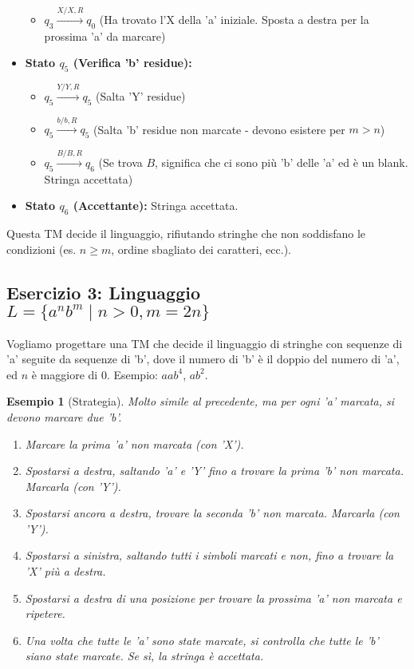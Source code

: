 \documentclass[a4paper]{article}
\newtheorem{example}{Esempio}
\begin{document}
\begin{itemize}
\begin{itemize}
            \item $q_3 \xrightarrow{X / X, R} q_0$ (Ha trovato l'X della 'a' iniziale. Sposta a destra per la prossima 'a' da marcare)
        \end{itemize}
    \item \textbf{Stato $q_5$ (Verifica 'b' residue):}
        \begin{itemize}
            \item $q_5 \xrightarrow{Y / Y, R} q_5$ (Salta 'Y' residue)
            \item $q_5 \xrightarrow{b / b, R} q_5$ (Salta 'b' residue non marcate - devono esistere per $m>n$)
            \item $q_5 \xrightarrow{B / B, R} q_6$ (Se trova $B$, significa che ci sono più 'b' delle 'a' ed è un blank. Stringa accettata)
        \end{itemize}
    \item \textbf{Stato $q_6$ (Accettante):} Stringa accettata.
\end{itemize}
Questa TM decide il linguaggio, rifiutando stringhe che non soddisfano le condizioni (es. $n \ge m$, ordine sbagliato dei caratteri, ecc.).

\subsection{Esercizio 3: Linguaggio $L = \{a^n b^m \mid n > 0, m = 2n\}$}

Vogliamo progettare una TM che decide il linguaggio di stringhe con sequenze di 'a' seguite da sequenze di 'b', dove il numero di 'b' è il doppio del numero di 'a', ed $n$ è maggiore di $0$. Esempio: $aab^{4}$, $ab^{2}$.

\begin{example}[Strategia]
Molto simile al precedente, ma per ogni 'a' marcata, si devono marcare due 'b'.
\begin{enumerate}
    \item Marcare la prima 'a' non marcata (con 'X').
    \item Spostarsi a destra, saltando 'a' e 'Y' fino a trovare la prima 'b' non marcata. Marcarla (con 'Y').
    \item Spostarsi ancora a destra, trovare la seconda 'b' non marcata. Marcarla (con 'Y').
    \item Spostarsi a sinistra, saltando tutti i simboli marcati e non, fino a trovare la 'X' più a destra.
    \item Spostarsi a destra di una posizione per trovare la prossima 'a' non marcata e ripetere.
    \item Una volta che tutte le 'a' sono state marcate, si controlla che tutte le 'b' siano state marcate. Se sì, la stringa è accettata.
\end{enumerate}
\end{example}
\end{document}
